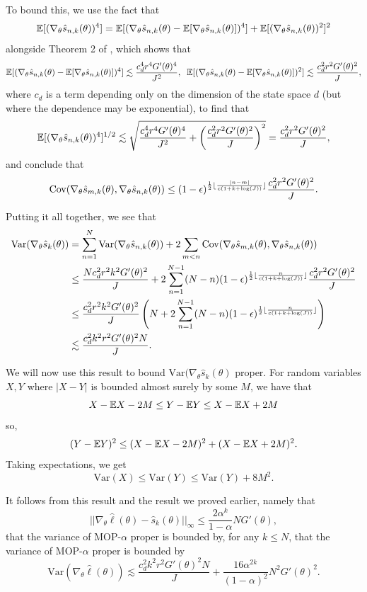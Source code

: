 \documentclass{article}
\begin{document}
To bound this, we use the fact that $$\mathbb{E}[(\nabla_\theta\hat s_{n,k}(\theta))^4] = \mathbb{E}[(\nabla_\theta\hat s_{n,k}(\theta)-\mathbb{E}[\nabla_\theta\hat s_{n,k}(\theta)])^4]+\mathbb{E}[(\nabla_\theta\hat s_{n,k}(\theta))^2]^2$$
alongside Theorem 2 of \cite{delMoral03}, which shows that
$$\mathbb{E}[(\nabla_\theta\hat s_{n,k}(\theta)-\mathbb{E}[\nabla_\theta\hat s_{n,k}(\theta)])^4] \lesssim \frac{c_d^4r^4G'(\theta)^4}{J^2}, \;\; \mathbb{E}[(\nabla_\theta\hat s_{n,k}(\theta)-\mathbb{E}[\nabla_\theta\hat s_{n,k}(\theta)])^2] \lesssim \frac{c_d^2r^2G'(\theta)^2}{J},$$
where $c_d$ is a term depending only on the dimension of the state space $d$ (but where the dependence may be exponential), to find that 
$$\mathbb{E}[(\nabla_\theta\hat s_{n,k}(\theta))^4]^{1/2} \lesssim  \sqrt{\frac{c_d^4r^4G'(\theta)^4}{J^2}+\left(\frac{c_d^2r^2G'(\theta)^2}{J}\right)^2} = \frac{c_d^2r^2G'(\theta)^2}{J},$$
and conclude that 
$$\text{Cov}(\nabla_\theta\hat s_{m,k}(\theta), \nabla_\theta\hat s_{n,k}(\theta)) \leq (1-\epsilon)^{\frac{1}{2}\lfloor \frac{|n-m|}{c(1+k+\log(J))} \rfloor}\frac{c_d^2r^2G'(\theta)^2}{J}.$$


Putting it all together, we see that
\begin{align*}
    \text{Var}(\nabla_\theta \hat s_{k}(\theta)) &= \sum_{n=1}^N \text{Var}(\nabla_\theta\hat s_{n,k}(\theta)) + 2\sum_{m<n} \text{Cov}(\nabla_\theta\hat s_{m,k}(\theta),\nabla_\theta\hat s_{n,k}(\theta))\\
    &\leq \frac{Nc_d^2r^2k^2G'(\theta)^2}{J} + 2\sum_{n=1}^{N-1} (N-n)(1-\epsilon)^{\frac{1}{2}\lfloor \frac{n}{c(1+k+\log(J))} \rfloor}\frac{c_d^2r^2G'(\theta)^2}{J} \\
    &\leq \frac{c_d^2r^2k^2G'(\theta)^2}{J} \left(N + 2\sum_{n=1}^{N-1} (N-n) (1-\epsilon)^{\frac{1}{2}\lfloor \frac{n}{c(1+k+\log(J))} \rfloor}\right) \\
    &\lesssim \frac{c_d^2k^2r^2G'(\theta)^2N}{J}.
\end{align*}

We will now use this result to bound $\text{Var}(\nabla_\theta \hat s_k(\theta)$ proper. For random variables $X,Y$ where $|X-Y|$ is bounded almost surely by some $M$, we have that 
$$X-\mathbb{E} X - 2M \leq Y - \mathbb{E} Y \leq X - \mathbb{E} X + 2M$$
so,
$$(Y-\mathbb{E} Y)^2 \leq (X-\mathbb{E} X - 2M)^2 + (X-\mathbb{E} X +2M)^2.$$
Taking expectations, we get
$$\text{Var}(X) \leq \text{Var}(Y) \leq \text{Var}(Y) + 8M^2.$$

It follows from this result and the result we proved earlier, namely that
$$||\nabla_\theta\hat\ell(\theta) - \hat s_k(\theta)||_\infty \leq \frac{2\alpha^k}{1-\alpha}NG'(\theta),$$
that the variance of MOP-$\alpha$ proper is bounded by, for any $k \leq N$,
that the variance of MOP-$\alpha$ proper is bounded by
$$\text{Var}(\nabla_\theta \hat\ell(\theta)) \lesssim \frac{c_d^2k^2r^2G'(\theta)^2N}{J} + \frac{16\alpha^{2k}}{(1-\alpha)^2}N^2G'(\theta)^2.$$
\end{document}
